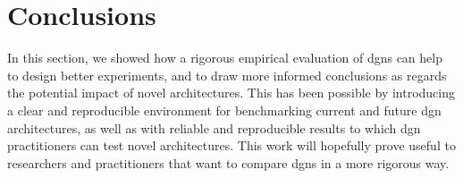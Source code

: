 \section{Conclusions}
In this section, we showed how a rigorous empirical evaluation of \glspl{dgn} can help to design better experiments, and to draw more informed conclusions as regards the potential impact of novel architectures. This has been possible by introducing a clear and reproducible environment for benchmarking current and future \gls{dgn} architectures, as well as with reliable and reproducible results to which \gls{dgn} practitioners can test novel architectures. This work will hopefully prove useful to researchers and practitioners that want to compare \glspl{dgn} in a more rigorous way.
